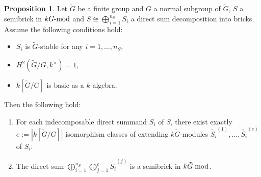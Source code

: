 \documentclass[pdftex,a4paper]{article}
\numberwithin{equation}{subsection}
\theoremstyle{definition}
\newtheorem{proposition}[theorem]{Proposition}
\newcommand{\lmod}{\operatorname{\mathrm{\hspace{-2pt}-mod}}}
\begin{document}
\begin{proposition}\label{brick extensions 2021-09-10 09:36:38}
	Let \(\tilde{G}\) be a finite group and \(G\) a normal subgroup of \(\tilde{G}\), \(S\) a semibrick in \(kG\lmod\) and \(S\cong \bigoplus_{i=1}^{n_{S}}S_i\) a direct sum decomposition into bricks. Assume the following conditions hold:
	\begin{itemize}
		\item \(S_i\) is \(\tilde{G}\)-stable for any \(i=1,\ldots, n_S\),
		\item \(H^2(\tilde{G}/G,k^\times)=1\),
		\item \(k[\tilde{G}/G]\) is basic as a \(k\)-algebra.
	\end{itemize}
	Then the following hold:
	\begin{enumerate}
		\item For each indecomposable direct summand \(S_i\) of \(S\), there exist exactly \(e:=|k[\tilde{G}/G]|\) isomorphism classes of extending \(k\tilde{G}\)-modules \(\tilde{S_i}^{(1)},\ldots,\tilde{S_i}^{(e)}\) of \(S_i\).\label{tag extending number 2021-10-17 16:01:42}
		\item The direct sum \(\bigoplus_{i=1}^{n_S}\bigoplus_{j=1}^{e}\tilde{S_i}^{(j)}\) is a semibrick in \(k\tilde{G}\lmod\).\label{taag sum ext brick 2021-10-17 16:06:11}
	\end{enumerate}
\end{proposition}
\end{document}
